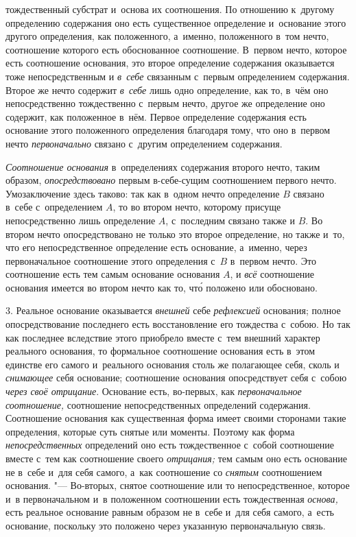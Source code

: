 тождественный субстрат и~основа их соотношения. По отношению к~другому
определению содержания оно есть существенное определение и~основание этого
другого определения, как положенного, а~именно, положенного в~том нечто,
соотношение которого есть обоснованное соотношение. В~первом нечто, которое
есть соотношение основания, это второе определение содержания оказывается
тоже непосредственным и {\em в~себе} связанным с~первым
определением содержания. Второе же нечто содержит
{\em в~себе} лишь одно определение, как то, в~чём оно
непосредственно тождественно с~первым нечто, другое же определение оно
содержит, как положенное в~нём. Первое определение содержания есть
основание этого положенного определения благодаря тому, что оно в~первом
нечто {\em первоначально} связано с~другим определением
содержания.

{\em Соотношение основания} в~определениях содержания
второго нечто, таким образом, {\em опосредствовано}
первым в-себе-сущим соотношением первого нечто. Умозаключение здесь таково:
так как в~одном нечто определение $B$ связано в~себе
с~определением $A$, то во втором нечто,
которому присуще непосредственно лишь определение
$A$, с~последним связано также и
$B$. Во втором нечто опосредствовано не только это
второе определение, но также и~то, что его непосредственное определение
есть основание, а~именно, через первоначальное соотношение этого
определения с~$B$ в~первом нечто. Это соотношение
есть тем самым основание основания $A$, и
{\em всё} соотношение основания имеется во втором нечто
как то, чт\'{о} положено или обосновано.

3. Реальное основание оказывается {\em внешней} себе
{\em рефлексией} основания; полное опосредствование
последнего есть восстановление его тождества с~собою. Но так как последнее
вследствие этого приобрело вместе с~тем внешний характер реального
основания, то формальное соотношение основания есть в~этом единстве его
самого и~реального основания столь же полагающее себя, сколь и
{\em снимающее} себя основание; соотношение основания
опосредствует себя с~собою {\em через своё отрицание}.
Основание есть, во-первых, как {\em первоначальное соотношение,}
соотношение непосредственных
определений содержания. Соотношение основания как существенная форма имеет
своими сторонами такие определения, которые суть снятые или моменты.
Поэтому как форма {\em непосредственных} определений
оно есть тождественное с~собой соотношение вместе с~тем как соотношение
своего {\em отрицания;} тем самым оно есть основание не
в~себе и~для себя самого, а~как соотношение со
{\em снятым} соотношением основания. "--- Во-вторых,
снятое соотношение или то непосредственное, которое и~в первоначальном и~в
положенном соотношении есть тождественная {\em основа,}
есть реальное основание равным образом не в~себе и~для себя самого, а~есть
основание, поскольку это положено через указанную первоначальную связь.

